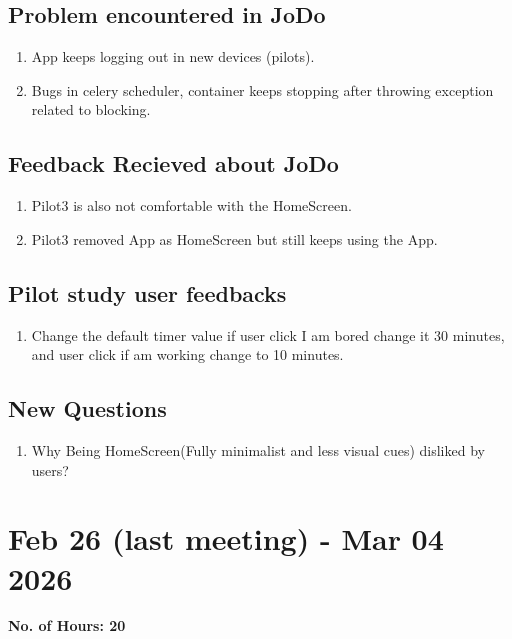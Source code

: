 \documentclass[12pt]{article}
\begin{document}
\subsection{Problem encountered in JoDo}
\begin{enumerate}
    \item App keeps logging out in new devices (pilots).
    \item Bugs in celery scheduler, container keeps stopping after throwing exception related to blocking.
  
\end{enumerate}
\subsection{Feedback Recieved about JoDo}
\begin{enumerate}
    \item Pilot3 is also not comfortable with the HomeScreen.
    \item  Pilot3 removed App as HomeScreen but still keeps using the App.
\end{enumerate}

\subsection{Pilot study user feedbacks}
\begin{enumerate}
    \item Change the default timer value if user click I am bored change it 30 minutes, and user click if am working change to 10 minutes.
\end{enumerate}
\subsection{New Questions}
\begin{enumerate}
    \item Why Being HomeScreen(Fully minimalist and less visual cues) disliked by users?
\end{enumerate}
\section{Feb 26 (last meeting) - Mar 04 2026}
{ \bf No. of Hours: 20}
\end{document}
